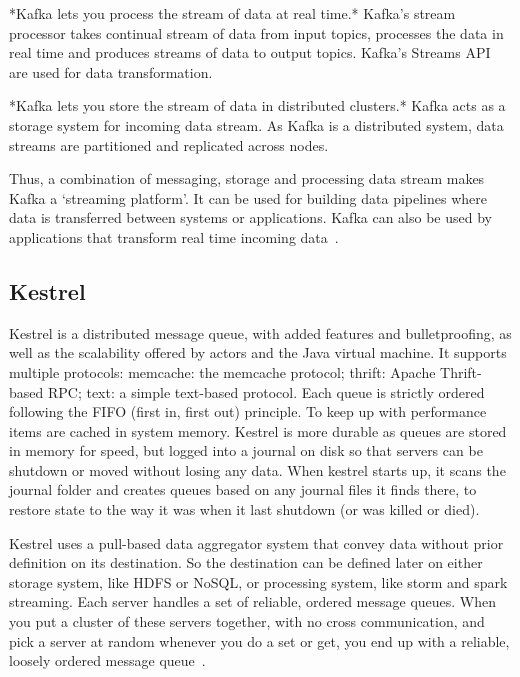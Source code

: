      *Kafka lets you process the stream of data at real time.* Kafka’s
     stream processor takes continual stream of data from input
     topics, processes the data in real time and produces streams of
     data to output topics. Kafka’s Streams API are used for data
     transformation.

     *Kafka lets you store the stream of data in distributed
     clusters.* Kafka acts as a storage system for incoming data
     stream. As Kafka is a distributed system, data streams are
     partitioned and replicated across nodes.

     Thus, a combination of messaging, storage and processing data
     stream makes Kafka a ‘streaming platform’. It can be used for
     building data pipelines where data is transferred between systems
     or applications. Kafka can also be used by applications that
     transform real time incoming data~\cite{www-kafka}.

     \pv

\subsection{Kestrel}
     
     Kestrel is a distributed message queue, with added features and
     bulletproofing, as well as the scalability offered by actors and
     the Java virtual machine. It supports multiple protocols:
     memcache: the memcache protocol; thrift: Apache Thrift-based RPC;
     text: a simple text-based protocol. Each queue is strictly
     ordered following the FIFO (first in, first out) principle. To
     keep up with performance items are cached in system
     memory. Kestrel is more durable as queues are stored in memory
     for speed, but logged into a journal on disk so that servers can
     be shutdown or moved without losing any data. When kestrel starts
     up, it scans the journal folder and creates queues based on any
     journal files it finds there, to restore state to the way it was
     when it last shutdown (or was killed or died).

     Kestrel uses a pull-based data aggregator system that convey data
     without prior definition on its destination. So the destination
     can be defined later on either storage system, like HDFS or
     NoSQL, or processing system, like storm and spark streaming. Each
     server handles a set of reliable, ordered message queues. When
     you put a cluster of these servers together, with no cross
     communication, and pick a server at random whenever you do a set
     or get, you end up with a reliable, loosely ordered message
     queue~\cite{git-kestrel}.

